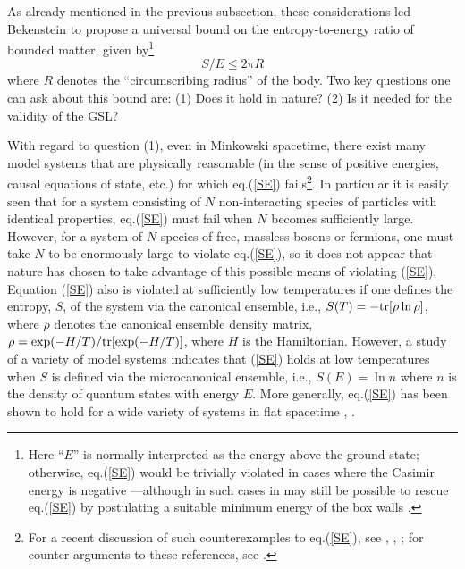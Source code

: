 As already mentioned in the previous subsection, these considerations
led Bekenstein \cite {b3} to propose a universal bound on the
entropy-to-energy ratio of bounded matter, given by\footnote{Here
``$E$'' is normally interpreted as the energy above the ground state;
otherwise, eq.(\ref{SE}) would be trivially violated in cases where
the Casimir energy is negative \cite{page3}---although in such cases in
may still be possible to rescue eq.(\ref{SE}) by postulating a
suitable minimum energy of the box walls \cite{beke}.}
\begin{equation}
S/E \leq 2\pi R
\label{SE}
\end{equation}
where $R$ denotes the ``circumscribing radius'' of the body. Two key
questions one can ask about this bound are: (1) Does it hold in
nature? (2) Is it needed for the validity of the GSL?

With regard to question (1), even in Minkowski spacetime, there exist
many model systems that are physically reasonable (in the sense of
positive energies, causal equations of state, etc.) for which
eq.(\ref{SE}) fails\footnote{For a recent discussion of such
counterexamples to eq.(\ref{SE}), see \cite{page1}, \cite{page2},
\cite{page3}; for counter-arguments to these references, see
\cite{beke}.}. In particular it is easily seen that for a system
consisting of $N$ non-interacting species of particles with identical
properties, eq.(\ref{SE}) must fail when $N$ becomes sufficiently
large. However, for a system of $N$ species of free, massless bosons
or fermions, one must take $N$ to be enormously large \cite{b4} to
violate eq.(\ref{SE}), so it does not appear that nature has chosen to
take advantage of this possible means of violating (\ref{SE}).
Equation (\ref{SE}) also is violated at sufficiently low temperatures
if one defines the entropy, $S$, of the system via the canonical
ensemble, i.e., $S(T) = - {\rm tr} [\rho \ln \rho]$, where $\rho$
denotes the canonical ensemble density matrix, $\rho = \exp(-H/T)/
{\rm tr} [\exp(- H/T)]$, where $H$ is the Hamiltonian. However, a
study of a variety of model systems \cite{b4} indicates that
(\ref{SE}) holds at low temperatures when $S$ is defined via the
microcanonical ensemble, i.e., $S(E) = \ln n$ where $n$ is the density
of quantum states with energy $E$. More generally, eq.(\ref{SE}) has
been shown to hold for a wide variety of systems in flat spacetime
\cite{b4}, \cite{bs}.

